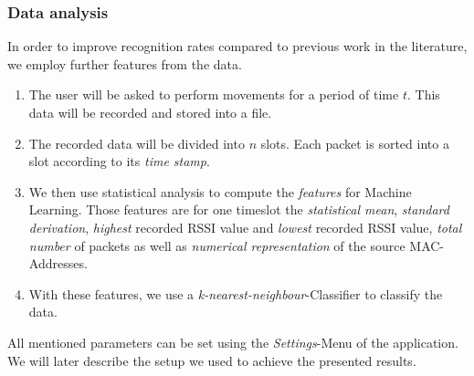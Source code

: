 \documentclass[conference]{IEEEtran}
\begin{document}
\subsubsection{Data analysis}
%
In order to improve recognition rates compared to previous work in the literature, we employ further features from the data.
\begin{enumerate}
\item The user will be asked to perform movements for a period of time $t$. 
This data will be recorded and stored into a file.
\item The recorded data will be divided into $n$ slots. 
Each packet is sorted into a slot according to its \emph{time stamp}.
\item We then use statistical analysis to compute the \emph{features} for Machine Learning. 
Those features are for one timeslot the \emph{statistical mean}, \emph{standard derivation}, \emph{highest} recorded RSSI value and \emph{lowest} recorded RSSI value, \emph{total number} of packets as well as \emph{numerical representation} of the source MAC-Addresses.

\item With these features, we use a \emph{k-nearest-neighbour}-Classifier to classify the data.
\end{enumerate}
All mentioned parameters can be set using the \emph{Settings}-Menu of the application. We will later describe the setup we used to achieve the presented results.
%
%
\end{document}

